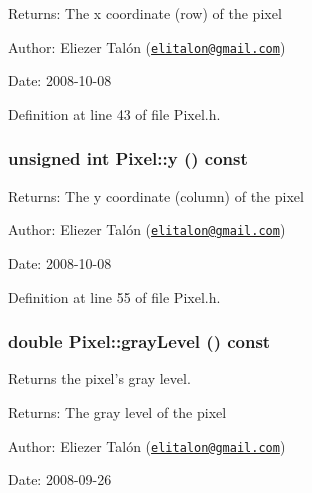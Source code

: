 \begin{Desc}
\item[Returns:]The x coordinate (row) of the pixel\end{Desc}
\begin{Desc}
\item[Author:]Eliezer Talón (\href{mailto:elitalon@gmail.com}{\tt elitalon@gmail.com}) \end{Desc}
\begin{Desc}
\item[Date:]2008-10-08 \end{Desc}


Definition at line 43 of file Pixel.h.\hypertarget{class_pixel_204cc91a99e1e4f1d96c9cf6caf5747a}{
\subsubsection[y]{\setlength{\rightskip}{0pt plus 5cm}unsigned int Pixel::y () const}}
\label{class_pixel_204cc91a99e1e4f1d96c9cf6caf5747a}


\begin{Desc}
\item[Returns:]The y coordinate (column) of the pixel\end{Desc}
\begin{Desc}
\item[Author:]Eliezer Talón (\href{mailto:elitalon@gmail.com}{\tt elitalon@gmail.com}) \end{Desc}
\begin{Desc}
\item[Date:]2008-10-08 \end{Desc}


Definition at line 55 of file Pixel.h.\hypertarget{class_pixel_6e445cee8bfa4475238823e0b6da42b0}{
\subsubsection[grayLevel]{\setlength{\rightskip}{0pt plus 5cm}double Pixel::grayLevel () const}}
\label{class_pixel_6e445cee8bfa4475238823e0b6da42b0}


Returns the pixel's gray level. 

\begin{Desc}
\item[Returns:]The gray level of the pixel\end{Desc}
\begin{Desc}
\item[Author:]Eliezer Talón (\href{mailto:elitalon@gmail.com}{\tt elitalon@gmail.com}) \end{Desc}
\begin{Desc}
\item[Date:]2008-09-26 \end{Desc}


